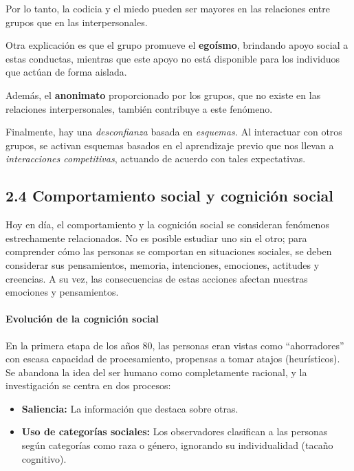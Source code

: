 \documentclass[
]{website}
\begin{document}
Por lo tanto, la codicia y el miedo pueden ser mayores en las relaciones entre grupos que en las interpersonales.

Otra explicación es que el grupo promueve el \textbf{egoísmo}, brindando apoyo social a estas conductas, mientras que este apoyo no está disponible para los individuos que actúan de forma aislada.

Además, el \textbf{anonimato} proporcionado por los grupos, que no existe en las relaciones interpersonales, también contribuye a este fenómeno.

Finalmente, hay una \emph{desconfianza} basada en \emph{esquemas.} Al interactuar con otros grupos, se activan esquemas basados en el aprendizaje previo que nos llevan a \emph{interacciones competitivas}, actuando de acuerdo con tales expectativas.

\subsection*{2.4 Comportamiento social y cognición social}\label{subtema2_4}

Hoy en día, el comportamiento y la cognición social se consideran fenómenos estrechamente relacionados. No es posible estudiar uno sin el otro; para comprender cómo las personas se comportan en situaciones sociales, se deben considerar sus pensamientos, memoria, intenciones, emociones, actitudes y creencias. A su vez, las consecuencias de estas acciones afectan nuestras emociones y pensamientos.

\paragraph*{Evolución de la cognición social}\label{evoluciuxf3n-de-la-cogniciuxf3n-social}

En la primera etapa de los años 80, las personas eran vistas como ``ahorradores'' con escasa capacidad de procesamiento, propensas a tomar atajos (heurísticos). Se abandona la idea del ser humano como completamente racional, y la investigación se centra en dos procesos:

\begin{itemize}
\item
  \textbf{Saliencia:} La información que destaca sobre otras.
\item
  \textbf{Uso de categorías sociales:} Los observadores clasifican a las personas según categorías como raza o género, ignorando su individualidad (tacaño cognitivo).
\end{itemize}
\end{document}

